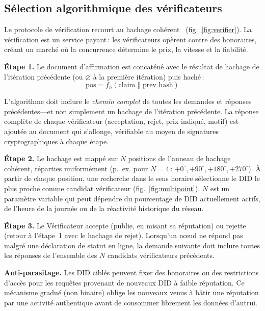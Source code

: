 \documentclass[11pt,a4paper,twocolumn]{article}
\begin{document}
\subsection{Sélection algorithmique des vérificateurs}

Le protocole de vérification recourt au hachage cohérent~\cite{karger1997} (fig.~\ref{fig:verifier}). La vérification est un service payant\,: les vérificateurs opèrent contre des honoraires, créant un marché où la concurrence détermine le prix, la vitesse et la fiabilité.

\textbf{Étape 1.} Le document d'affirmation est concaténé avec le résultat de hachage de l'itération précédente (ou $\varnothing$ à la première itération) puis haché\,:
\begin{equation}
\text{pos} = f_h(\text{claim} \| \text{prev\_hash})
\label{eq:hash}
\end{equation}

L'algorithme doit inclure le \emph{chemin complet} de toutes les demandes et réponses précédentes---et non simplement un hachage de l'itération précédente. La réponse complète de chaque vérificateur (acceptation, rejet, prix indiqué, motif) est ajoutée au document qui s'allonge, vérifiable au moyen de signatures cryptographiques à chaque étape.

\textbf{Étape 2.} Le hachage est mappé sur $N$ positions de l'anneau de hachage cohérent, réparties uniformément (p.~ex. pour $N=4$\,: $+0^{\circ}, +90^{\circ}, +180^{\circ}, +270^{\circ}$). À partir de chaque position, une recherche dans le sens horaire sélectionne le DID le plus proche comme candidat vérificateur (fig.~\ref{fig:multipoint}). $N$ est un paramètre variable qui peut dépendre du pourcentage de DID actuellement actifs, de l'heure de la journée ou de la réactivité historique du réseau.

\textbf{Étape 3.} Le Vérificateur accepte (publie, en misant sa réputation) ou rejette (retour à l'étape~1 avec le hachage de rejet). Lorsqu'un n\oe ud ne répond pas malgré une déclaration de statut en ligne, la demande suivante doit inclure toutes les réponses de l'ensemble des $N$ candidats vérificateurs précédents.

\textbf{Anti-parasitage.} Les DID ciblés peuvent fixer des honoraires ou des restrictions d'accès pour les requêtes provenant de nouveaux DID à faible réputation. Ce mécanisme gradué (non binaire) oblige les nouveaux venus à bâtir une réputation par une activité authentique avant de consommer librement les données d'autrui.
\end{document}
